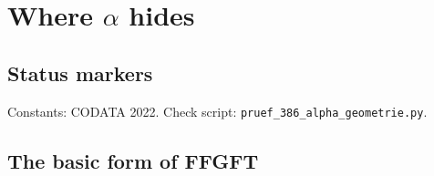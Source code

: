 
\providecommand{\BM}{\textbf{[B]}}
\providecommand{\KM}{\textbf{[K]}}
\providecommand{\SM}{\textbf{[S]}}
\providecommand{\XM}{\textbf{[X]}}
\providecommand{\QM}{\textbf{[Q]}}

\chapter*{Where \texorpdfstring{$\alpha$}{alpha} hides}

\begin{abstract}
FFGFT is first and foremost a ratio-based theory. It works in natural units with the convention
$\alpha=1$ and a correspondingly redefined charge; in this basic form it needs no fractal
correction. This document shows that nothing is lost in doing so and that the geometry becomes
visible. With $\hbar=c=\varepsilon_0=1$ one has $e^2=4\pi\alpha$; with $\alpha=1$, $e=\sqrt{4\pi}$,
and the charge is measured by the full surface of the sphere. $\alpha$ moves into the charge unit
and is the ratio of two spheres around every charged particle, $\alpha=r_e/\lambda_C$; with
$\alpha=1$ the Coulomb sphere, the Compton sphere and the Bohr radius merge into one scale. In the
basic form the FFGFT bridge reads $\xi E_0^2=1$ with $E_0^2=m_em_\mu$. This has an immediate
geometric reading: $\xi$ is the product of the Compton radii of electron and muon,
$\xi=\lambda_e\lambda_\mu$, an area. The number $1/\xi=7500=100\cdot75$ is the same one that
carries the recursion, with starting value $\xi_0=1/7500$ and rotation number $74/75$. Only the
translation into SI needs a reference energy, the MeV, and there, and only there, the fractal
correction appears.
\end{abstract}

\section*{Status markers}

Constants: CODATA 2022. Check script: \texttt{pruef\_386\_alpha\_geometrie.py}.

\section{The basic form of FFGFT}

